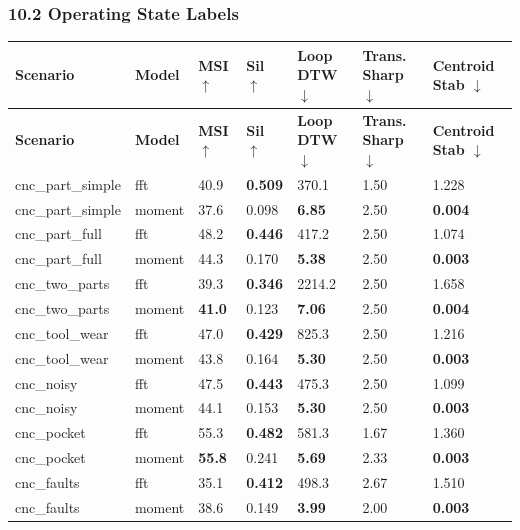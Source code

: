 \documentclass[11pt,a4paper]{article}
\begin{document}
\subsubsection{10.2 Operating State Labels}

\begin{longtable}{|l|l|l|l|l|l|l|}
\hline
\textbf{Scenario} & \textbf{Model} & \textbf{MSI $\uparrow$} & \textbf{Sil $\uparrow$} & \textbf{Loop DTW $\downarrow$} & \textbf{Trans. Sharp $\downarrow$} & \textbf{Centroid Stab $\downarrow$} \\
\hline
\endfirsthead
\hline
\textbf{Scenario} & \textbf{Model} & \textbf{MSI $\uparrow$} & \textbf{Sil $\uparrow$} & \textbf{Loop DTW $\downarrow$} & \textbf{Trans. Sharp $\downarrow$} & \textbf{Centroid Stab $\downarrow$} \\
\hline
\endhead
\hline
\endfoot
cnc\_part\_simple & fft & 40.9 & \textbf{0.509} & 370.1 & 1.50 & 1.228 \\
\hline
cnc\_part\_simple & moment & 37.6 & 0.098 & \textbf{6.85} & 2.50 & \textbf{0.004} \\
\hline
cnc\_part\_full & fft & 48.2 & \textbf{0.446} & 417.2 & 2.50 & 1.074 \\
\hline
cnc\_part\_full & moment & 44.3 & 0.170 & \textbf{5.38} & 2.50 & \textbf{0.003} \\
\hline
cnc\_two\_parts & fft & 39.3 & \textbf{0.346} & 2214.2 & 2.50 & 1.658 \\
\hline
cnc\_two\_parts & moment & \textbf{41.0} & 0.123 & \textbf{7.06} & 2.50 & \textbf{0.004} \\
\hline
cnc\_tool\_wear & fft & 47.0 & \textbf{0.429} & 825.3 & 2.50 & 1.216 \\
\hline
cnc\_tool\_wear & moment & 43.8 & 0.164 & \textbf{5.30} & 2.50 & \textbf{0.003} \\
\hline
cnc\_noisy & fft & 47.5 & \textbf{0.443} & 475.3 & 2.50 & 1.099 \\
\hline
cnc\_noisy & moment & 44.1 & 0.153 & \textbf{5.30} & 2.50 & \textbf{0.003} \\
\hline
cnc\_pocket & fft & 55.3 & \textbf{0.482} & 581.3 & 1.67 & 1.360 \\
\hline
cnc\_pocket & moment & \textbf{55.8} & 0.241 & \textbf{5.69} & 2.33 & \textbf{0.003} \\
\hline
cnc\_faults & fft & 35.1 & \textbf{0.412} & 498.3 & 2.67 & 1.510 \\
\hline
cnc\_faults & moment & 38.6 & 0.149 & \textbf{3.99} & 2.00 & \textbf{0.003} \\
\hline
\end{longtable}
\end{document}

